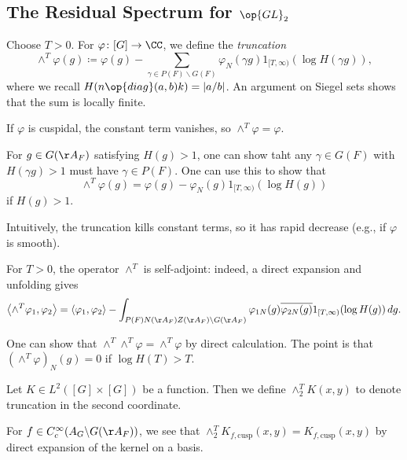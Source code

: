 \documentclass{article}
\begin{document}
\subsection{The Residual Spectrum for \texorpdfstring{$\op{GL}_2$}{GL(2)}}
\begin{definition}[truncation]
	Choose $T>0$. For $\varphi\colon[G]\to\CC$, we define the \textit{truncation}
	\[\land^T\varphi(g)\coloneqq\varphi(g)-\sum_{\gamma\in P(F)\backslash G(F)}\varphi_N(\gamma g)1_{[T,\infty)}(\log H(\gamma g)),\]
	where we recall $H(n\op{diag}(a,b)k)=\left|a/b\right|$. An argument on Siegel sets shows that the sum is locally finite.
\end{definition}
\begin{example}
	If $\varphi$ is cuspidal, the constant term vanishes, so $\land^T\varphi=\varphi$.
\end{example}
\begin{remark}
	For $g\in G(\AA_F)$ satisfying $H(g)>1$, one can show taht any $\gamma\in G(F)$ with $H(\gamma g)>1$ must have $\gamma\in P(F)$. One can use this to show that
	\[\land^T\varphi(g)=\varphi(g)-\varphi_N(g)1_{[T,\infty)}(\log H(g))\]
	if $H(g)>1$.
\end{remark}
\begin{remark}
	Intuitively, the truncation kills constant terms, so it has rapid decrease (e.g., if $\varphi$ is smooth).
\end{remark}
\begin{remark}
	For $T>0$, the operator $\land^T$ is self-adjoint: indeed, a direct expansion and unfolding gives
	\[\left\langle\land^T\varphi_1,\varphi_2\right\rangle=\langle\varphi_1,\varphi_2\rangle-\int_{P(F)N(\AA_F)Z(\AA_F)\backslash G(\AA_F)}\varphi_{1N}(g)\overline{\varphi_{2N}(g)}1_{[T,\infty)}(\log H(g))\,dg.\]
\end{remark}
\begin{remark}
	One can show that $\land^T\land^T\varphi=\land^T\varphi$ by direct calculation. The point is that $\left(\land^T\varphi\right)_N(g)=0$ if $\log H(T)>T$.
\end{remark}
\begin{notation}
	Let $K\in L^2([G]\times[G])$ be a function. Then we define $\land^T_2K(x,y)$ to denote truncation in the second coordinate.
\end{notation}
\begin{example}
	For $f\in C_c^\infty(A_G\backslash G(\AA_F))$, we see that $\land^T_2K_{f,\mathrm{cusp}}(x,y)=K_{f,\mathrm{cusp}}(x,y)$ by direct expansion of the kernel on a basis.
\end{example}
\end{document}
